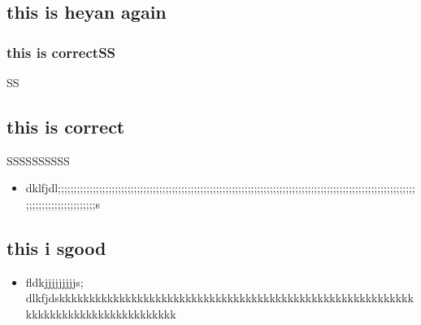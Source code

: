 \documentclass[11pt]{article}
\begin{document}
\subsection{this is heyan again}
\label{sec-2-2}
\subsubsection{this is correctSS}
\label{sec-2-2-1}
SS

\subsection{this is correct}
\label{sec-2-3}
SSSSSSSSSS
\begin{itemize}
\item dklfjdl;;;;;;;;;;;;;;;;;;;;;;;;;;;;;;;;;;;;;;;;;;;;;;;;;;;;;;;;;;;;;;;;;;;;;;;;;;;;;;;;;;;;;;;;;;;;;;;;;;;;;;;;;;;;;;;;;;;;;;;;;;;;;;;;;;;;;;;s
\end{itemize}

\subsection{this i sgood}
\label{sec-2-4}
\begin{itemize}
\item fldkjjjjjjjjjs;                                    dlkfjdskkkkkkkkkkkkkkkkkkkkkkkkkkkkkkkkkkkkkkkkkkkkkkkkkkkkkkkkkkkkkkkkkkkkkkkkkkkkkkkkkkkk
\end{itemize}
\end{document}
